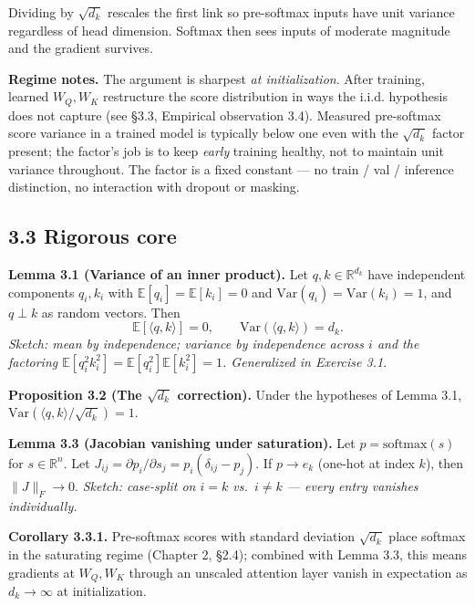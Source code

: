 \documentclass[
]{article}
\begin{document}
Dividing by \(\sqrt{d_k}\) rescales the first link so pre-softmax inputs
have unit variance regardless of head dimension. Softmax then sees
inputs of moderate magnitude and the gradient survives.

\textbf{Regime notes.} The argument is sharpest \emph{at
initialization}. After training, learned \(W_Q, W_K\) restructure the
score distribution in ways the i.i.d. hypothesis does not capture (see
§3.3, Empirical observation 3.4). Measured pre-softmax score variance in
a trained model is typically below one even with the \(\sqrt{d_k}\)
factor present; the factor's job is to keep \emph{early} training
healthy, not to maintain unit variance throughout. The factor is a fixed
constant --- no train / val / inference distinction, no interaction with
dropout or masking.

\hypertarget{rigorous-core}{%
\subsection{3.3 Rigorous core}\label{rigorous-core}}

\textbf{Lemma 3.1 (Variance of an inner product).} Let
\(q, k \in \mathbb{R}^{d_k}\) have independent components \(q_i, k_i\)
with \(\mathbb{E}[q_i] = \mathbb{E}[k_i] = 0\) and
\(\text{Var}(q_i) = \text{Var}(k_i) = 1\), and \(q \perp k\) as random
vectors. Then
\[\mathbb{E}[\langle q, k \rangle] = 0, \qquad \text{Var}(\langle q, k \rangle) = d_k.\]
\emph{Sketch: mean by independence; variance by independence across
\(i\) and the factoring
\(\mathbb{E}[q_i^2 k_i^2] = \mathbb{E}[q_i^2]\mathbb{E}[k_i^2] = 1\).
Generalized in Exercise 3.1.}

\textbf{Proposition 3.2 (The \(\sqrt{d_k}\) correction).} Under the
hypotheses of Lemma 3.1,
\(\text{Var}(\langle q, k \rangle / \sqrt{d_k}) = 1\).

\textbf{Lemma 3.3 (Jacobian vanishing under saturation).} Let
\(p = \text{softmax}(s)\) for \(s \in \mathbb{R}^n\). Let
\(J_{ij} = \partial p_i / \partial s_j = p_i(\delta_{ij} - p_j)\). If
\(p \to e_k\) (one-hot at index \(k\)), then \(\|J\|_F \to 0\).
\emph{Sketch: case-split on \(i = k\) vs.~\(i \ne k\) --- every entry
vanishes individually.}

\textbf{Corollary 3.3.1.} Pre-softmax scores with standard deviation
\(\sqrt{d_k}\) place softmax in the saturating regime (Chapter 2, §2.4);
combined with Lemma 3.3, this means gradients at \(W_Q, W_K\) through an
unscaled attention layer vanish in expectation as \(d_k \to \infty\) at
initialization.
\end{document}

